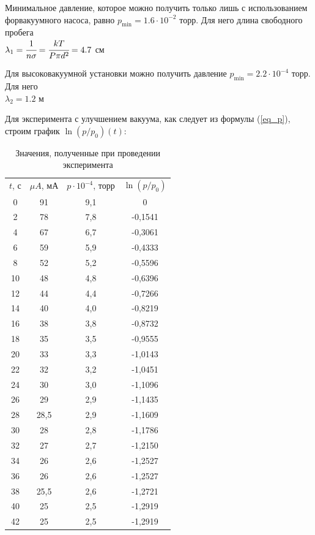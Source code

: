 \documentclass[a4paper,12pt]{article}
\begin{document}
Минимальное давление, которое можно получить только лишь с использованием форвакуумного насоса, равно $p_\text{min} = 1.6 \cdot 10^{-2}$ торр. Для него длина свободного пробега \vspace*{0.2cm} \\
$\lambda_1 = \cfrac{1}{n\sigma} = \cfrac{kT}{P\pi d^2} = 4.7$ см 
\par Для высоковакуумной установки можно получить давление $p_\text{min} = 2.2 \cdot 10^{-4}$ торр. Для него \\
$\lambda_2 = 1.2$ м
\par Для эксперимента с улучшением вакуума, как следует из формулы (\ref{eq_p}), строим график $\ln(p/p_0) (t)$:

\begin{table}%
	\centering
\begin{tabular}{|c|c|c|c|}
	\hline
	$t$, с & $\mu A$, мА & $p \cdot 10^{-4}$, торр & $\ln(p/p_0)$ \\ \cline{1-4}
	0 & 91 &  9,1 & 0 \\\cline{1-4}
	2 & 78 &  7,8 & -0,1541 \\\cline{1-4}
	4 & 67 &  6,7 & -0,3061 \\\cline{1-4}
	6 & 59 &  5,9 & -0,4333 \\ \cline{1-4}
	8 & 52 &  5,2 & -0,5596 \\\cline{1-4}
	10 & 48 &  4,8 & -0,6396 \\\cline{1-4}
	12 & 44 &  4,4 & -0,7266 \\\cline{1-4}
	14 & 40 &  4,0 & -0,8219 \\\cline{1-4}
	16 & 38 &  3,8 & -0,8732 \\\cline{1-4}
	18 & 35 &  3,5 & -0,9555 \\\cline{1-4}
	20 & 33 &  3,3 & -1,0143 \\ \cline{1-4}
	22 & 32 &  3,2 & -1,0451 \\\cline{1-4}
	24 & 30 &  3,0 & -1,1096 \\\cline{1-4}
	26 & 29 &  2,9 & -1,1435 \\\cline{1-4}
	28 & 28,5 &  2,9 & -1,1609 \\\cline{1-4}
	30 & 28 &  2,8 & -1,1786 \\\cline{1-4}
	32 & 27 &  2,7 & -1,2150 \\\cline{1-4}
	34 & 26 &  2,6 & -1,2527 \\\cline{1-4}
	36 & 26 &  2,6 & -1,2527 \\\cline{1-4}
	38 & 25,5 &  2,6 & -1,2721 \\\cline{1-4}
	40 & 25 &  2,5 & -1,2919 \\\cline{1-4}
	42 & 25 &  2,5 &-1,2919 \\ \cline{1-4}
\end{tabular}
	\caption{Значения, полученные при проведении эксперимента}
	\label{Tab:tab_exp}
\end{table}
\end{document}
